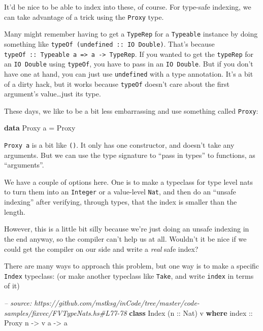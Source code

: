 \documentclass[]{article}
\newenvironment{Shaded}{\begin{snugshade}}{\end{snugshade}}
\newcommand{\CommentTok}[1]{\textcolor[rgb]{0.56,0.35,0.01}{\textit{#1}}}
\newcommand{\DataTypeTok}[1]{\textcolor[rgb]{0.13,0.29,0.53}{#1}}
\newcommand{\FunctionTok}[1]{\textcolor[rgb]{0.00,0.00,0.00}{#1}}
\newcommand{\KeywordTok}[1]{\textcolor[rgb]{0.13,0.29,0.53}{\textbf{#1}}}
\newcommand{\NormalTok}[1]{#1}
\newcommand{\OtherTok}[1]{\textcolor[rgb]{0.56,0.35,0.01}{#1}}
\begin{document}
It'd be nice to be able to index into these, of course. For type-safe indexing,
we can take advantage of a trick using the \texttt{Proxy} type.

Many might remember having to get a \texttt{TypeRep} for a \texttt{Typeable}
instance by doing something like \texttt{typeOf\ (undefined\ ::\ IO\ Double)}.
That's because
\texttt{typeOf\ ::\ Typeable\ a\ =\textgreater{}\ a\ -\textgreater{}\ TypeRep}.
If you wanted to get the \texttt{typeRep} for an \texttt{IO\ Double} using
\texttt{typeOf}, you have to pass in an \texttt{IO\ Double}. But if you don't
have one at hand, you can just use \texttt{undefined} with a type annotation.
It's a bit of a dirty hack, but it works because \texttt{typeOf} doesn't care
about the first argument's value\ldots{}just its type.

These days, we like to be a bit less embarrassing and use something called
\texttt{Proxy}:

\begin{Shaded}
\begin{Highlighting}[]
\KeywordTok{data} \DataTypeTok{Proxy}\NormalTok{ a }\FunctionTok{=} \DataTypeTok{Proxy}
\end{Highlighting}
\end{Shaded}

\texttt{Proxy\ a} is a bit like \texttt{()}. It only has one constructor, and
doesn't take any arguments. But we can use the type signature to ``pass in
types'' to functions, as ``arguments''.

We have a couple of options here. One is to make a typeclass for type level nats
to turn them into an \texttt{Integer} or a value-level \texttt{Nat}, and then do
an ``unsafe indexing'' after verifying, through types, that the index is smaller
than the length.

However, this is a little bit silly because we're just doing an unsafe indexing
in the end anyway, so the compiler can't help us at all. Wouldn't it be nice if
we could get the compiler on our side and write a \emph{real} safe index?

There are many ways to approach this problem, but one way is to make a specific
\texttt{Index} typeclass: (or make another typeclass like \texttt{Take}, and
write \texttt{index} in terms of it)

\begin{Shaded}
\begin{Highlighting}[]
\CommentTok{-- source: https://github.com/mstksg/inCode/tree/master/code-samples/fixvec/FVTypeNats.hs#L77-78}
\KeywordTok{class} \DataTypeTok{Index}\NormalTok{ (}\OtherTok{n ::} \DataTypeTok{Nat}\NormalTok{) v }\KeywordTok{where}
\OtherTok{    index ::} \DataTypeTok{Proxy}\NormalTok{ n }\OtherTok{->}\NormalTok{ v a }\OtherTok{->}\NormalTok{ a}
\end{Highlighting}
\end{Shaded}
\end{document}
